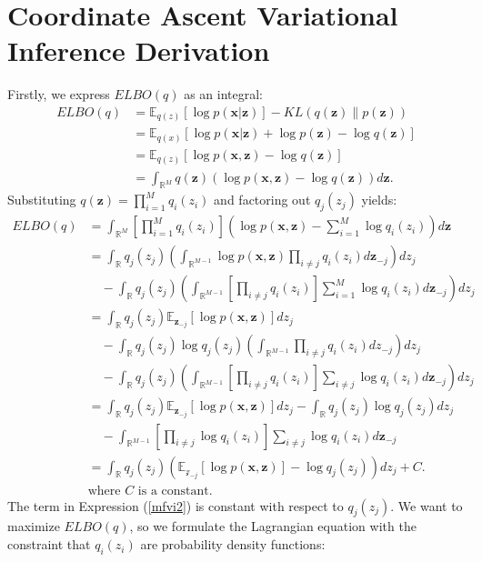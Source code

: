 \documentclass[honours,12pt]{unswthesis}
\newcommand{\R}{\mathbb{R}}
\numberwithin{equation}{section}
\theoremstyle{definition}
\begin{document}
\chapter{Coordinate Ascent Variational Inference Derivation}\label{app:mfvi}
Firstly, we express $ELBO(q)$ as an integral:
\begin{align*}
ELBO(q)&= \mathbb{E}_{q(z)}[\log p(\bm{x}|\bm{z})]-KL(q(\bm{z})\|p(\bm{z}))\\
&= \mathbb{E}_{q(x)}[\log p(\bm{x}|\bm{z})+\log p(\bm{z})-\log q(\bm{z})]\\
&= \mathbb{E}_{q(z)}[\log p(\bm{x}, \bm{z})-\log q(\bm{z})]\\
&= \int_{\R^M}q(\bm{z})(\log p(\bm{x},\bm{z})-\log q(\bm{z}))d\bm{z}.
\end{align*}
Substituting $q(\bm{z})=\prod^M_{i=1}q_i(z_i)$ and factoring out $q_j(z_j)$ yields:
\begin{align}
ELBO(q)&= \int_{\R^M}\left[\prod^M_{i=1}q_i(z_i)\right]\left(\log p(\bm{x},\bm{z})-\sum_{i=1}^M\log q_i(z_i)\right)d\bm{z}\nonumber\\
&= \int_{\R}q_j(z_j)\left(\int_{\R^{M-1}}\log p(\bm{x},\bm{z})\prod_{i\neq j}q_i(z_i)d\bm{z}_{-j} \right) dz_j\nonumber\\
&\quad -\int_{\R}q_j(z_j)\left(\int_{\R^{M-1}}\left[\prod_{i\neq j}q_i(z_i)\right]\sum_{i=1}^M \log q_i(z_i)d\bm{z}_{-j}\right)dz_j\nonumber\\
&= \int_{\R}q_j(z_j)\mathbb{E}_{\bm{z}_{-j}}[\log p(\bm{x},\bm{z})]dz_j\nonumber\\
&\quad -\int_{\R}q_j(z_j)\log q_j(z_j)\left(\int_{\R^{M-1}}\prod_{i\neq j}q_i(z_i)dz_{-j}\right) dz_j\nonumber\\
&\quad -\int_{\R}q_j(z_j)\left(\int_{\R^{M-1}}\left[\prod_{i\neq j}q_i(z_i)\right]\sum_{i\neq j}\log q_i(z_i)d{\bm{z}_{-j}}\right)dz_j\nonumber\\
&= \int_\R q_j(z_j)\mathbb{E}_{\bm{z}_{-j}}[\log p(\bm{x},\bm{z})]dz_j-\int_\R q_j(z_j)\log q_j(z_j)dz_j\nonumber\\
&\quad -\int_{\R^{M-1}}\left[\prod_{i\neq j}\log q_i(z_i)\right]\sum_{i\neq j}\log q_i(z_i)d{\bm{z}_{-j}}\label{mfvi2}
\\&= \int_{\R}q_j(z_j)\left(\mathbb{E}_{\mathcal{z}_{-j}}[\log p(\bm{x},\bm{z})]-\log q_j(z_j)\right)dz_j+C. \label{mfvi3}\\
&\text{where }C\text{ is a constant.}\nonumber
\end{align}
The term in Expression (\ref{mfvi2}) is constant with respect to $q_j(z_j)$. We want to maximize $ELBO(q)$, so we formulate the Lagrangian equation with the constraint that $q_i(z_i)$ are probability density functions:
\end{document}
